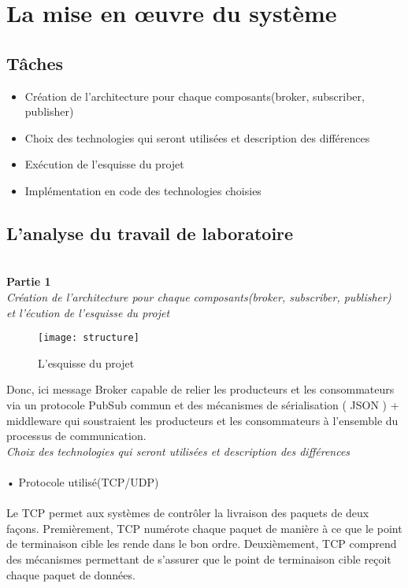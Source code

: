 \section{La mise en œuvre du système}

\subsection{Tâches}

\begin{itemize}
	\item Création de l'architecture pour chaque composants(broker, subscriber, publisher)
	\item Choix des technologies qui seront utilisées et description des différences
	\item Exécution de l'esquisse du projet
	\item Implémentation en code des technologies choisies
\end{itemize}


\subsection{L'analyse du travail de laboratoire}

\textbf{\\Partie 1}\\

\emph{Création de l'architecture pour chaque composants(broker, subscriber, publisher) et l'écution de l'esquisse du projet}\\

\begin{figure}[!ht]
	\centering
	\texttt{[image: structure]}
	\caption{L'esquisse du projet}\label{structure}
\end{figure}
Donc, ici message Broker capable de relier les producteurs et les consommateurs via un protocole PubSub commun et des mécanismes de sérialisation ( JSON ) + middleware qui soustraient les producteurs et les consommateurs à l'ensemble du processus de communication.\\

\emph{Choix des technologies qui seront utilisées et description des différences}\\
\\• Protocole utilisé(TCP/UDP)\\
\\Le TCP permet aux systèmes de contrôler la livraison des paquets de deux façons. Premièrement, TCP numérote chaque paquet de manière à ce que le point de terminaison cible les rende dans le bon ordre. Deuxièmement, TCP comprend des mécanismes permettant de s’assurer que le point de terminaison cible reçoit chaque paquet de données.

